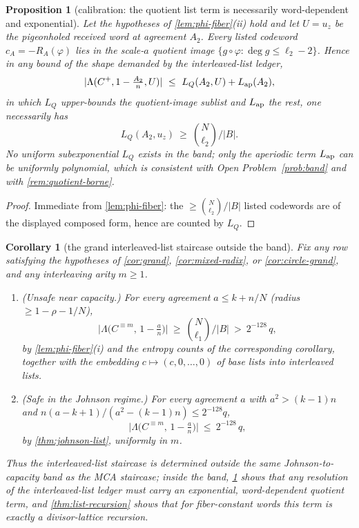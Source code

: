 \documentclass[11pt]{article}
\newtheorem{proposition}[theorem]{Proposition}
\newtheorem{corollary}[theorem]{Corollary}
\theoremstyle{definition}
\theoremstyle{remark}
\newcommand{\B}{B}
\newcommand{\Lst}{\Lambda}
\begin{document}
\begin{proposition}[calibration: the quotient list term is necessarily word-dependent and exponential]\label{prop:list-calibration}
Let the hypotheses of \cref{lem:phi-fiber}\textup{(ii)} hold and let $U=u_z$ be the pigeonholed received word at agreement $A_2$. Every listed codeword $c_A=-R_A(\varphi)$ lies in the scale-$a$ quotient image $\{g\circ\varphi:\deg g\le\ell_2-2\}$. Hence in any bound of the shape demanded by the interleaved-list ledger,
\[
|\Lst(C^+,1-\tfrac{A_2}n,U)|\ \le\ L_Q(A_2,U)+L_{\rm ap}(A_2),
\]
in which $L_Q$ upper-bounds the quotient-image sublist and $L_{\rm ap}$ the rest, one necessarily has
\[
L_Q(A_2,u_z)\ \ge\ \binom N{\ell_2}\Big/|\B| .
\]
No uniform subexponential $L_Q$ exists in the band; only the aperiodic term $L_{\rm ap}$ can be uniformly polynomial, which is consistent with Open Problem~\ref{prob:band} and with \cref{rem:quotient-borne}.
\end{proposition}

\begin{proof}
Immediate from \cref{lem:phi-fiber}: the $\ge\binom N{\ell_2}/|\B|$ listed codewords are of the displayed composed form, hence are counted by $L_Q$.
\end{proof}

\begin{corollary}[the grand interleaved-list staircase outside the band]\label{cor:list-sandwich}
Fix any row satisfying the hypotheses of \cref{cor:grand}, \cref{cor:mixed-radix}, or \cref{cor:circle-grand}, and any interleaving arity $m\ge1$.
\begin{enumerate}[label=\textup{(\roman*)}]
\item \textup{(Unsafe near capacity.)} For every agreement $a\le k+n/N$ \textup(radius $\ge1-\rho-1/N$\textup),
\[
\bigl|\Lst\bigl(C^{\equiv m},\,1-\tfrac an\bigr)\bigr|\ \ge\ \binom N{\ell_1}\Big/|\B|\ >\ 2^{-128}\,q ,
\]
by \cref{lem:phi-fiber}\textup{(i)} and the entropy counts of the corresponding corollary, together with the embedding $c\mapsto(c,0,\dots,0)$ of base lists into interleaved lists.
\item \textup{(Safe in the Johnson regime.)} For every agreement $a$ with $a^2>(k-1)n$ and $n(a-k+1)/(a^2-(k-1)n)\le2^{-128}q$,
\[
\bigl|\Lst\bigl(C^{\equiv m},\,1-\tfrac an\bigr)\bigr|\ \le\ 2^{-128}\,q ,
\]
by \cref{thm:johnson-list}, uniformly in $m$.
\end{enumerate}
Thus the interleaved-list staircase is determined outside the same Johnson-to-capacity band as the MCA staircase; inside the band, \cref{prop:list-calibration} shows that any resolution of the interleaved-list ledger must carry an exponential, word-dependent quotient term, and \cref{thm:list-recursion} shows that for fiber-constant words this term is exactly a divisor-lattice recursion.
\end{corollary}
\end{document}
